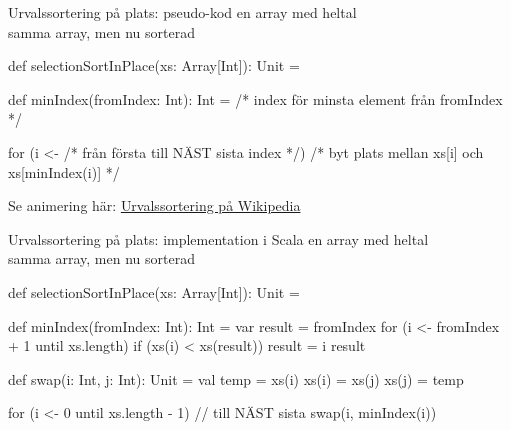 \begin{Slide}{Urvalssortering på plats: pseudo-kod}
 en array med heltal\\
 samma array, men nu sorterad\\

\begin{Code}
def selectionSortInPlace(xs: Array[Int]): Unit = {
  def minIndex(fromIndex: Int): Int = {
    /* index för minsta element från fromIndex  */
  }

  for (i <- /* från första till NÄST sista index */) {
    /* byt plats mellan xs[i] och xs[minIndex(i)] */
  }
}
\end{Code}
\pause
Se animering här: \href{https://sv.wikipedia.org/wiki/Urvalssortering}{Urvalssortering på Wikipedia}
\end{Slide}

\begin{Slide}{Urvalssortering på plats: implementation i Scala}\SlideFontSmall
\vspace{-0.25em}
 en array med heltal\\
 samma array, men nu sorterad\\

\begin{Code}[numberstyle=\ttfamily\SlideFontSize{6}{7.5},numbers=left]
def selectionSortInPlace(xs: Array[Int]): Unit = {
  def minIndex(fromIndex: Int): Int = {
    var result = fromIndex
    for (i <- fromIndex + 1 until xs.length) {
      if (xs(i) < xs(result)) result = i
    }
    result
  }

  def swap(i: Int, j: Int): Unit = {
    val temp = xs(i)
    xs(i) = xs(j)
    xs(j) = temp
  }

  for (i <- 0 until xs.length - 1) { // till NÄST sista
    swap(i, minIndex(i))
  }
}
\end{Code}
\end{Slide}

